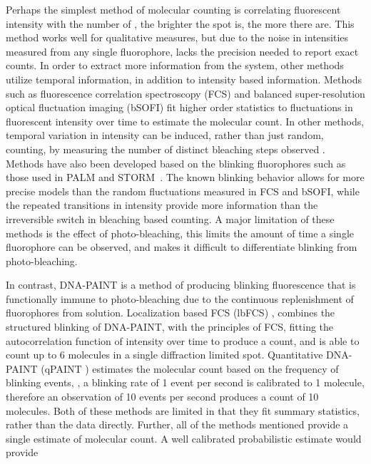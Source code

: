 Perhaps the simplest method of molecular counting is correlating fluorescent
  intensity with the number of \smallobjects \cite{schmied_2012, tolar_2005}, \ie the brighter the spot is, the more there are.
  This method works well for qualitative measures, but due to the noise in intensities 
  measured from any single fluorophore, lacks the precision needed to report exact counts.
  In order to extract more information from the system, other methods utilize temporal information, 
  in addition to intensity based information. 
  Methods such as fluorescence correlation spectroscopy (FCS) \cite{otsuka_2023, wachsmuth_2015, politi_2018} and 
  balanced super-resolution optical fluctuation imaging (bSOFI) \cite{geissbuehler_2012}
  fit higher order statistics to fluctuations in fluorescent intensity over time to estimate the molecular count.
  In other methods, temporal variation in intensity can be induced, rather than just random, \ie
  counting, by measuring the number of distinct bleaching steps observed \cite{ulbrich_2007, jain_2011}.
  Methods have also been developed based on the blinking fluorophores \cite{rollins_stochastic_2015, nino_2017} 
  such as those used in PALM \cite{sengupta_pcPALM_2011, lee_counting_2012} and STORM~\cite{patel_blinking_2021}. 
  The known blinking behavior allows for more precise models than the random fluctuations measured in FCS and bSOFI, while the 
  repeated transitions in intensity provide more information than the irreversible switch in bleaching based counting.
  A major limitation of these methods is the effect of photo-bleaching, this limits the amount of time
  a single fluorophore can be observed, and makes it difficult to differentiate blinking from photo-bleaching.


In contrast, DNA-PAINT \cite{schnitzbauer_2017} is a method of producing blinking fluorescence that is functionally
    immune to photo-bleaching due to the continuous replenishment of fluorophores from solution. %
    Localization based FCS (lbFCS) \cite{stein_2021}, combines the structured blinking of DNA-PAINT, with the 
    principles of FCS, fitting the autocorrelation function of intensity over time to produce a count,
    and is able to count up to 6 molecules in a single diffraction limited spot.
    Quantitative DNA-PAINT (qPAINT \cite{jungmann_2016}) estimates the molecular count based on the frequency of blinking events, \ie, 
    a blinking rate of 1 event per second is calibrated to 1 molecule, therefore an observation of 10 events per second
    produces a count of 10 molecules.
    Both of these methods are limited in that they fit summary statistics,
    rather than the data directly. 
    Further, all of the methods mentioned provide a single estimate of molecular count.
    A well calibrated probabilistic estimate would provide 
    
